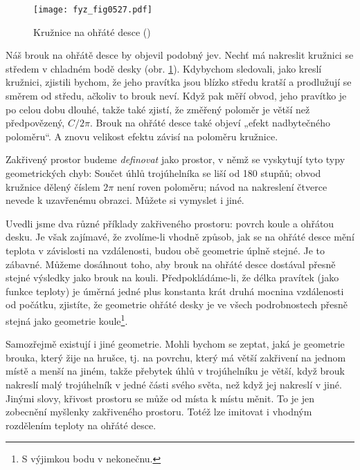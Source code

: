     \begin{figure}[ht!] %
      \centering
      \texttt{[image: fyz\_fig0527.pdf]}
      \caption{Kružnice na ohřáté desce
               (\cite[s.~779]{Feynman02})}
      \label{fyz:fig0527}
    \end{figure}
    
    Náš brouk na ohřátě desce by objevil podobný jev. Nechť má nakreslit kružnici se středem v 
    chladném bodě desky (obr. \ref{fyz:fig0527}). Kdybychom sledovali, jako kreslí kružnici, 
    zjistili bychom, že jeho pravítka jsou blízko středu kratší a prodlužují se směrem od středu, 
    ačkoliv to brouk neví. Když pak měří obvod, jeho pravítko je po celou dobu dlouhé, takže také 
    zjistí, že změřený poloměr je větší než předpovězený, \(C/2\pi\). Brouk na ohřáté desce také 
    objeví „efekt nadbytečného poloměru“. A znovu velikost efektu závisí na poloměru kružnice.
    
    Zakřivený prostor budeme \emph{definovat} jako prostor, v němž se vyskytují tyto typy 
    geometrických chyb: Součet úhlů trojúhelníka se liší od \num{180} stupňů; obvod kružnice dělený 
    číslem \(2\pi\) není roven poloměru; návod na nakreslení čtverce nevede k uzavřenému obrazci. 
    Můžete si vymyslet i jiné.
    
    Uvedli jsme dva různé příklady zakřiveného prostoru: povrch koule a ohřátou desku. Je však 
    zajímavé, že zvolíme-li vhodně způsob, jak se na ohřáté desce mění teplota v závislosti na 
    vzdálenosti, budou obě geometrie úplně stejné. Je to zábavné. Můžeme dosáhnout toho, aby brouk 
    na ohřáté desce dostával přesně stejné výsledky jako brouk na kouli. Předpokládáme-li, že délka 
    pravítek (jako funkce teploty) je úměrná jedné plus konstanta krát druhá mocnina vzdálenosti od 
    počátku, zjistíte, že geometrie ohřáté desky je ve všech podrobnostech přesně stejná jako 
    geometrie koule\footnote{S výjimkou bodu v nekonečnu.}. 
    
    Samozřejmě existují i jiné geometrie. Mohli bychom se zeptat, jaká je geometrie brouka, který 
    žije na hrušce, tj. na povrchu, který má větší zakřivení na jednom místě a menší na jiném, 
    takže přebytek úhlů v trojúhelníku je větší, když brouk nakreslí malý trojúhelník v jedné části 
    svého světa, než když jej nakreslí v jiné. Jinými slovy, křivost prostoru se může od místa k 
    místu měnit. To je jen zobecnění myšlenky zakřiveného prostoru. Totéž lze imitovat i vhodným 
    rozdělením teploty na ohřáté desce. 
    

